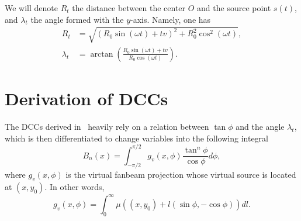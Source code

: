 \documentclass[a4paper]{article}
\numberwithin{equation}{section}
\begin{document}
We will denote $R_t$ the distance between the center $O$ and the source point $s(t)$, and $\lambda_t$ the angle formed with the $y$-axis. Namely, one has
\begin{align}
R_t &= \sqrt{ \left( R_0 \sin(\omega t) + tv \right)^2 + R_0^2 \cos^2(\omega t) }, \\
\lambda_t &= \arctan \left( \frac{R_0 \sin(\omega t) + tv}{R_0 \cos(\omega t)} \right).
\end{align}

\section{Derivation of DCCs}

The DCCs derived in~\cite{clackdoyle2015consistency} heavily rely on a relation between $\tan \phi$ and the angle $\lambda_t$, which is then differentiated to change variables into the following integral
\begin{equation}
	B_n(x) = \int_{-\pi/2}^{\pi/2} g_v(x,\phi) \frac{\tan^n \phi}{\cos \phi} d\phi,	
	\label{eq:Bn_x_phi}
\end{equation}
where $g_v(x,\phi)$ is the virtual fanbeam projection whose virtual source is located at $(x,y_0)$. In other words,
\begin{equation}
	g_v(x,\phi) = \int_0^{\infty} \mu\left( (x,y_0) + l(\sin \phi, -\cos \phi) \right) dl.
\end{equation}
\end{document}
